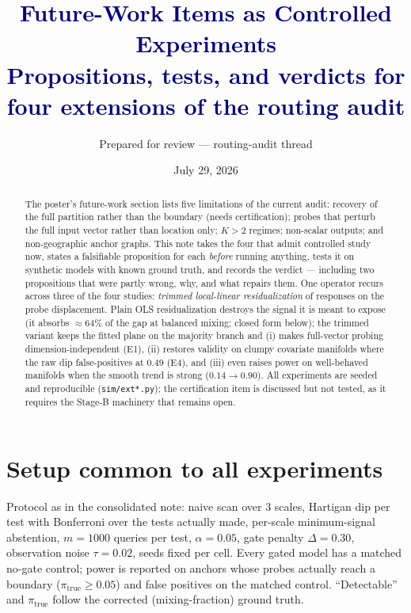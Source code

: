 \documentclass[11pt]{article}
\title{\textcolor{navy}{Future-Work Items as Controlled Experiments\\
\large Propositions, tests, and verdicts for four extensions of the routing audit}}
\author{Prepared for review --- routing-audit thread}
\date{July 29, 2026}
\begin{document}
\maketitle

\begin{abstract}
The poster's future-work section lists five limitations of the current audit: recovery of the
full partition rather than the boundary (needs certification); probes that perturb the full
input vector rather than location only; $K>2$ regimes; non-scalar outputs; and
non-geographic anchor graphs. This note takes the four that admit controlled study now,
states a falsifiable proposition for each \emph{before} running anything, tests it on
synthetic models with known ground truth, and records the verdict --- including two
propositions that were partly wrong, why, and what repairs them. One operator recurs across
three of the four studies: \emph{trimmed local-linear residualization} of responses on the
probe displacement. Plain OLS residualization destroys the signal it is meant to expose
(it absorbs $\approx 64\%$ of the gap at balanced mixing; closed form below); the trimmed
variant keeps the fitted plane on the majority branch and (i) makes full-vector probing
dimension-independent (E1), (ii) restores validity on clumpy covariate manifolds where the
raw dip false-positives at $0.49$ (E4), and (iii) even raises power on well-behaved
manifolds when the smooth trend is strong ($0.14 \to 0.90$). All experiments are seeded and
reproducible (\texttt{sim/ext*.py}); the certification item is discussed but not tested, as
it requires the Stage-B machinery that remains open.
\end{abstract}

\section{Setup common to all experiments}

Protocol as in the consolidated note: naive scan over 3 scales, Hartigan dip per test with
Bonferroni over the tests actually made, per-scale minimum-signal abstention, $m{=}1000$
queries per test, $\alpha=0.05$, gate penalty $\Delta=0.30$, observation noise
$\tau=0.02$, seeds fixed per cell. Every gated model has a matched no-gate control; power is
reported on anchors whose probes actually reach a boundary ($\pi_{\mathrm{true}}\ge 0.05$)
and false positives on the matched control. ``Detectable'' and $\pi_{\mathrm{true}}$ follow
the corrected (mixing-fraction) ground truth.
\end{document}

